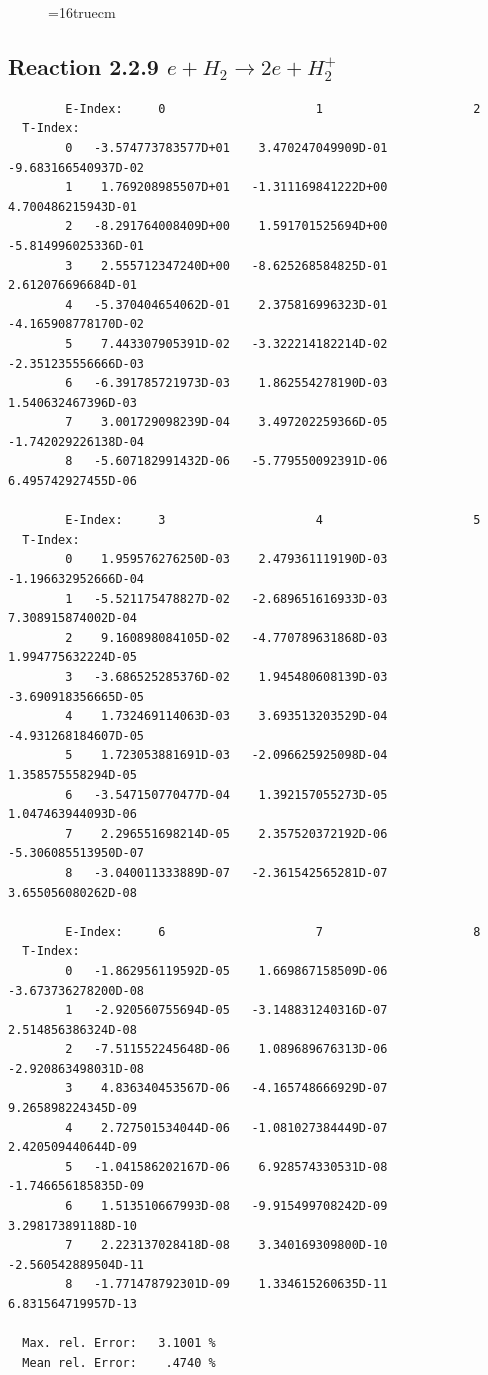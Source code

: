 \documentclass[12pt,dvips]{article}
\begin{document}
\begin{figure} \label{2.2.5g}
\epsfxsize=16truecm
\end{figure}
\newpage


\subsection{
Reaction 2.2.9  $  e + H_2       \rightarrow 2e + H_2^+  $
}



\begin{small}\begin{verbatim}
        E-Index:     0                     1                     2
  T-Index:
        0   -3.574773783577D+01    3.470247049909D-01   -9.683166540937D-02
        1    1.769208985507D+01   -1.311169841222D+00    4.700486215943D-01
        2   -8.291764008409D+00    1.591701525694D+00   -5.814996025336D-01
        3    2.555712347240D+00   -8.625268584825D-01    2.612076696684D-01
        4   -5.370404654062D-01    2.375816996323D-01   -4.165908778170D-02
        5    7.443307905391D-02   -3.322214182214D-02   -2.351235556666D-03
        6   -6.391785721973D-03    1.862554278190D-03    1.540632467396D-03
        7    3.001729098239D-04    3.497202259366D-05   -1.742029226138D-04
        8   -5.607182991432D-06   -5.779550092391D-06    6.495742927455D-06

        E-Index:     3                     4                     5
  T-Index:
        0    1.959576276250D-03    2.479361119190D-03   -1.196632952666D-04
        1   -5.521175478827D-02   -2.689651616933D-03    7.308915874002D-04
        2    9.160898084105D-02   -4.770789631868D-03    1.994775632224D-05
        3   -3.686525285376D-02    1.945480608139D-03   -3.690918356665D-05
        4    1.732469114063D-03    3.693513203529D-04   -4.931268184607D-05
        5    1.723053881691D-03   -2.096625925098D-04    1.358575558294D-05
        6   -3.547150770477D-04    1.392157055273D-05    1.047463944093D-06
        7    2.296551698214D-05    2.357520372192D-06   -5.306085513950D-07
        8   -3.040011333889D-07   -2.361542565281D-07    3.655056080262D-08

        E-Index:     6                     7                     8
  T-Index:
        0   -1.862956119592D-05    1.669867158509D-06   -3.673736278200D-08
        1   -2.920560755694D-05   -3.148831240316D-07    2.514856386324D-08
        2   -7.511552245648D-06    1.089689676313D-06   -2.920863498031D-08
        3    4.836340453567D-06   -4.165748666929D-07    9.265898224345D-09
        4    2.727501534044D-06   -1.081027384449D-07    2.420509440644D-09
        5   -1.041586202167D-06    6.928574330531D-08   -1.746656185835D-09
        6    1.513510667993D-08   -9.915499708242D-09    3.298173891188D-10
        7    2.223137028418D-08    3.340169309800D-10   -2.560542889504D-11
        8   -1.771478792301D-09    1.334615260635D-11    6.831564719957D-13

  Max. rel. Error:   3.1001 %
  Mean rel. Error:    .4740 %

\end{verbatim}\end{small}
\end{document}
